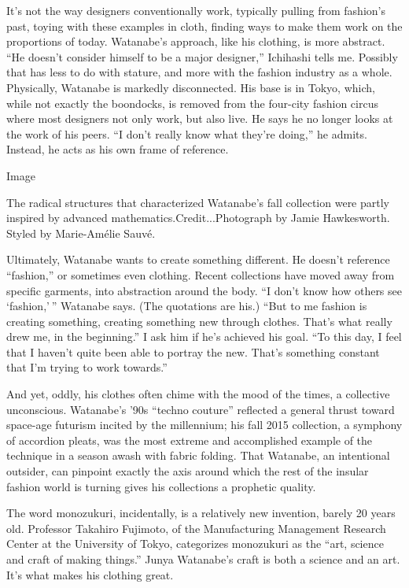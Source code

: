 It's not the way designers conventionally work, typically pulling from
fashion's past, toying with these examples in cloth, finding ways to
make them work on the proportions of today. Watanabe's approach, like
his clothing, is more abstract. ``He doesn't consider himself to be a
major designer,'' Ichihashi tells me. Possibly that has less to do with
stature, and more with the fashion industry as a whole. Physically,
Watanabe is markedly disconnected. His base is in Tokyo, which, while
not exactly the boondocks, is removed from the four-city fashion circus
where most designers not only work, but also live. He says he no longer
looks at the work of his peers. ``I don't really know what they're
doing,'' he admits. Instead, he acts as his own frame of reference.

Image

The radical structures that characterized Watanabe's fall collection
were partly inspired by advanced mathematics.Credit...Photograph by
Jamie Hawkesworth. Styled by Marie-Amélie Sauvé.

Ultimately, Watanabe wants to create something different. He doesn't
reference ``fashion,'' or sometimes even clothing. Recent collections
have moved away from specific garments, into abstraction around the
body. ``I don't know how others see `fashion,' '' Watanabe says. (The
quotations are his.) ``But to me fashion is creating something, creating
something new through clothes. That's what really drew me, in the
beginning.'' I ask him if he's achieved his goal. ``To this day, I feel
that I haven't quite been able to portray the new. That's something
constant that I'm trying to work towards.''

And yet, oddly, his clothes often chime with the mood of the times, a
collective unconscious. Watanabe's '90s ``techno couture'' reflected a
general thrust toward space-age futurism incited by the millennium; his
fall 2015 collection, a symphony of accordion pleats, was the most
extreme and accomplished example of the technique in a season awash with
fabric folding. That Watanabe, an intentional outsider, can pinpoint
exactly the axis around which the rest of the insular fashion world is
turning gives his collections a prophetic quality.

The word monozukuri, incidentally, is a relatively new invention, barely
20 years old. Professor Takahiro Fujimoto, of the Manufacturing
Management Research Center at the University of Tokyo, categorizes
monozukuri as the ``art, science and craft of making things.'' Junya
Watanabe's craft is both a science and an art. It's what makes his
clothing great.

